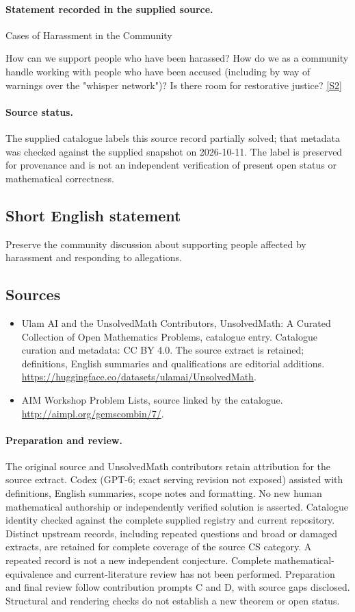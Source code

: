 \documentclass[11pt]{article}
\newcommand{\sref}[2]{\hyperlink{source:#1:#2}{[S#2]}}
\begin{document}
\paragraph{Statement recorded in the supplied source.}
Cases of Harassment in the Community

How can we support people who have been harassed? How do we as a community handle working with people who have been accused (including by way of warnings over the "whisper network")? Is there room for restorative justice? \sref{statement}{2}
\paragraph{Source status.}
The supplied catalogue labels this source record partially solved; that metadata was checked against the supplied snapshot on 2026-10-11. The label is preserved for provenance and is not an independent verification of present open status or mathematical correctness.
\subsection{Short English statement}
Preserve the community discussion about supporting people affected by harassment and responding to allegations.
\subsection{Sources}
\begin{itemize}
\item[\hypertarget{source:statement:1}{S1}] Ulam AI and the UnsolvedMath Contributors, UnsolvedMath: A Curated Collection of Open Mathematics Problems, catalogue entry. Catalogue curation and metadata: CC BY 4.0. The source extract is retained; definitions, English summaries and qualifications are editorial additions.
\url{https://huggingface.co/datasets/ulamai/UnsolvedMath}.
\item[\hypertarget{source:statement:2}{S2}] AIM Workshop Problem Lists, source linked by the catalogue.
\url{http://aimpl.org/gemscombin/7/}.
\end{itemize}
\paragraph{Preparation and review.}
The original source and UnsolvedMath contributors retain attribution for the source extract. Codex (GPT-6; exact serving revision not exposed) assisted with definitions, English summaries, scope notes and formatting. No new human mathematical authorship or independently verified solution is asserted. Catalogue identity checked against the complete supplied registry and current repository. Distinct upstream records, including repeated questions and broad or damaged extracts, are retained for complete coverage of the source CS category. A repeated record is not a new independent conjecture. Complete mathematical-equivalence and current-literature review has not been performed. Preparation and final review follow contribution prompts C and D, with source gaps disclosed. Structural and rendering checks do not establish a new theorem or open status.
\label{end:statement}
\end{document}
